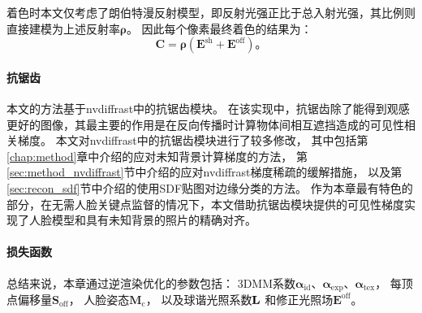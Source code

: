 着色时本文仅考虑了朗伯特漫反射模型，即反射光强正比于总入射光强，其比例则直接建模为上述反射率$\mathbf{\rho}$。
因此每个像素最终着色的结果为：
\begin{equation}
    \mathbf{C} = \mathbf{\rho} \left(\mathbf{E}^\mathrm{sh} + \mathbf{E}^\mathrm{off}\right) \text{。}
\end{equation}

\paragraph{抗锯齿}
本文的方法基于nvdiffrast中的抗锯齿模块。
在该实现中，抗锯齿除了能得到观感更好的图像，其最主要的作用是在反向传播时计算物体间相互遮挡造成的可见性相关梯度。
本文对nvdiffrast中的抗锯齿模块进行了较多修改，
其中包括第\ref{chap:method}章中介绍的应对未知背景计算梯度的方法，
第\ref{sec:method_nvdiffrast}节中介绍的应对nvdiffrast梯度稀疏的缓解措施，
以及第\ref{sec:recon_sdf}节中介绍的使用SDF贴图对边缘分类的方法。
作为本章最有特色的部分，在无需人脸关键点监督的情况下，本文借助抗锯齿模块提供的可见性梯度实现了人脸模型和具有未知背景的照片的精确对齐。

\paragraph{损失函数}
总结来说，本章通过逆渲染优化的参数包括：
3DMM系数$\mathbf{\alpha}_\mathrm{id}$、$\mathbf{\alpha}_\mathrm{exp}$、$\mathbf{\alpha}_\mathrm{tex}$，
每顶点偏移量$\mathbf{S}_\mathrm{off}$，
人脸姿态$\mathbf{M}_\mathrm{c}$，
以及球谐光照系数$\mathbf{L}$
和修正光照场$\mathbf{E}^\mathrm{off}$。

